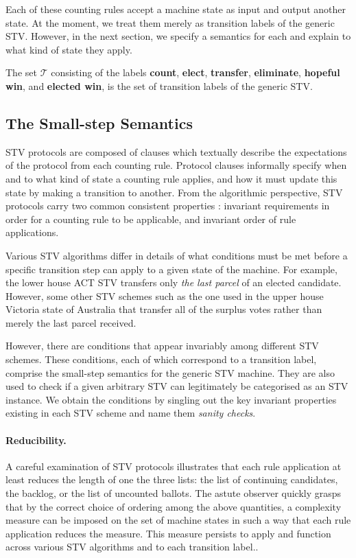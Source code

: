 \documentclass{llncs}
\begin{document}
Each of these counting rules accept a machine state as input and output another state. At the moment, we treat them merely as transition labels of the generic STV. However, in the next section, we specify a semantics for each and explain to what kind of state they apply.
\begin{definition}\label{stv:trans}
The set $\mathcal{T}$ consisting of the labels \textbf{count}, \textbf{elect}, \textbf{transfer}, \textbf{eliminate}, \textbf{hopeful win}, and \textbf{elected win}, is the set of transition labels of the generic STV.
\end{definition}
\subsection{The Small-step Semantics}
STV protocols are composed of clauses which textually describe the expectations of the protocol from each counting rule. Protocol clauses informally specify when and to what kind of state a counting rule applies, and how it must update this state by making a transition to another. From the algorithmic perspective, STV protocols carry two common   consistent properties : invariant requirements in order for a counting rule to be applicable, and invariant order of rule applications. 


Various STV algorithms differ in details of what conditions must be met before a specific transition step can apply to a given state of the machine. For example, the lower house ACT STV transfers only \emph{the last parcel} of an elected candidate. However, some other STV schemes such as the one used in the upper house Victoria state of Australia that transfer all of the surplus votes rather than merely the last parcel received. 


However, there are conditions that appear invariably among different STV schemes. These conditions, each of which correspond to a transition label, comprise the small-step semantics for the generic STV machine. They are also used to check if a given arbitrary STV can legitimately be categorised as an STV instance. We obtain the conditions by singling out the key invariant properties existing in each STV scheme and name them \emph{sanity checks}.
\paragraph{Reducibility.} 
A careful examination of STV protocols illustrates that each rule application at least reduces the length of one the three lists:  the list of continuing candidates, the backlog, or the list of uncounted ballots. The astute observer quickly grasps that by the correct choice of ordering among the above quantities, a complexity measure can be imposed on the set of machine states in such a way that each rule application reduces the measure. This measure persists to apply and function across various STV algorithms and to each transition label..     
\end{document}
